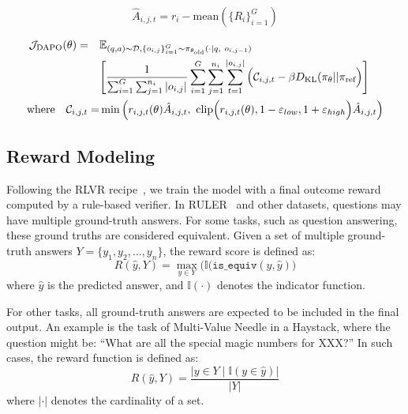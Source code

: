 {{{\begin{equation}
\hat{A}_{i,j,t} = r_i - \text{mean}(\{R_i\}_{i=1}^G)
\label{eq:adv_multiconv}
\end{equation}

\begin{equation}
\begin{aligned}
\mathcal{J}_{\text{DAPO}}(\theta) = \quad&\mathbb{E}_{(q,a)\sim \mathcal{D}, \{o_{i,j}\}_{i=1}^G\sim \pi_{\theta_\text{old}}(\cdot\mid q,~o_{i,j-1})}\\&
\Bigg[\frac{1}{\sum_{i=1}^{G}\sum_{j=1}^{n_i}|o_{i,j}|}\sum_{i=1}^{G}\sum_{j=1}^{n_i}\sum_{t=1}^{|o_{i,j}|}
 \Big(\mathcal{C}_{i,j,t} - \beta D_{\text{KL}}(\pi_{\theta} || \pi_{\text{ref}} \Big) \Bigg]
\\
\text{where\quad} \mathcal{C}_{i,j,t} = &\min\Big(r_{i,j,t}(\theta) \hat{A}_{i,j,t},  
\ \text{clip} \Big( r_{i,j,t}(\theta), 1 - \varepsilon_{low}, 1 + \varepsilon_{high} \Big) \hat{A}_{i,j,t}\Big)
\label{eq:loss_multiconv}
\end{aligned}
\end{equation}

\subsection{Reward Modeling}
\label{sec:reward}
Following the RLVR recipe~\cite{guo2025deepseek, jin2025search, yu2025dapo},
we train the model with a final outcome reward computed by a rule-based verifier. 
In RULER~\cite{hsieh2024ruler} and other datasets, questions may have multiple ground-truth answers. 
For some tasks, such as question answering, these ground truths are considered equivalent. Given a set of multiple ground-truth answers $Y = \{y_1, y_2, \dots, y_n\}$, the reward score is defined as:
\begin{equation}
R(\hat{y}, Y) = \max_{y \in Y} \big(\mathbb{I}( \texttt{is\_equiv}(y,\hat{y})\big)
\end{equation}
where $\hat{y}$ is the predicted answer, and $\mathbb{I}(\cdot)$ denotes the indicator function.

For other tasks, all ground-truth answers are expected to be included in the final output. An example is the task of Multi-Value Needle in a Haystack, where the question might be: ``What are all the special magic numbers for XXX?'' 
In such cases, the reward function is defined as:
\begin{equation}
R(\hat{y}, Y) = \frac{|{y \in Y \mid \mathbb{I}(y \in \hat{y})}|}{|Y|}
\end{equation}
where $|\cdot|$ denotes the cardinality of a set.

}}}
